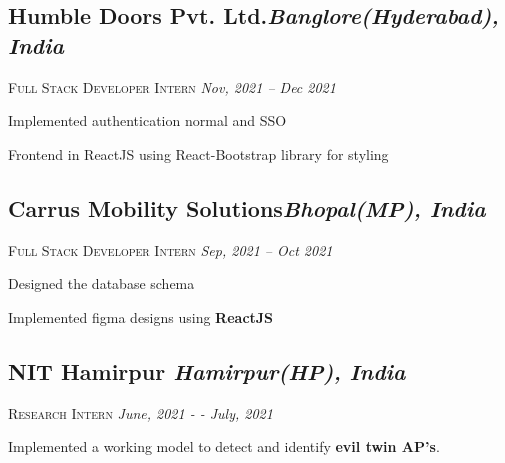 \documentclass[11pt]{article}
\begin{document}
\subsection*{Humble Doors Pvt. Ltd.\hfill \normalsize \normalfont \textit{Banglore(Hyderabad), India}}
\vspace{-1ex}
\textsc{\textmd{Full Stack Developer Intern}} \hfill \normalsize \textit{Nov, 2021 -- Dec 2021}
\vspace{-1ex}

\begin{description}
\setlength{\itemindent}{2\parindent}
\setlength{\itemsep}{0em}
\item[$\bullet$]{Implemented authentication normal and SSO}
\item[$\bullet$]{Frontend in ReactJS using React-Bootstrap library for styling}
\end{description}

\subsection*{Carrus Mobility Solutions\hfill \normalsize \normalfont \textit{Bhopal(MP), India}}
\vspace{-1ex}
\textsc{\textmd{Full Stack Developer Intern}} \hfill \normalsize \textit{Sep, 2021 -- Oct 2021}
\vspace{-1ex}

\begin{description}
\setlength{\itemindent}{2\parindent}
\setlength{\itemsep}{0em}
\item[$\bullet$]{Designed the database schema}
\item[$\bullet$]{Implemented figma designs using \textbf{ReactJS}}
\end{description}

\subsection*{NIT Hamirpur \hfill \normalsize \normalfont \textit{Hamirpur(HP), India}}
\vspace{-1ex}
\textsc{\textmd{Research Intern}} \hfill \normalsize \textit{June, 2021 - - July, 2021}
\vspace{-1ex}

\begin{description}
\setlength{\itemindent}{2\parindent}
\setlength{\itemsep}{0em}
\item[$\bullet$]{Implemented a working model to detect and identify \textbf{evil twin AP's}.}
\end{description}
\end{document}
